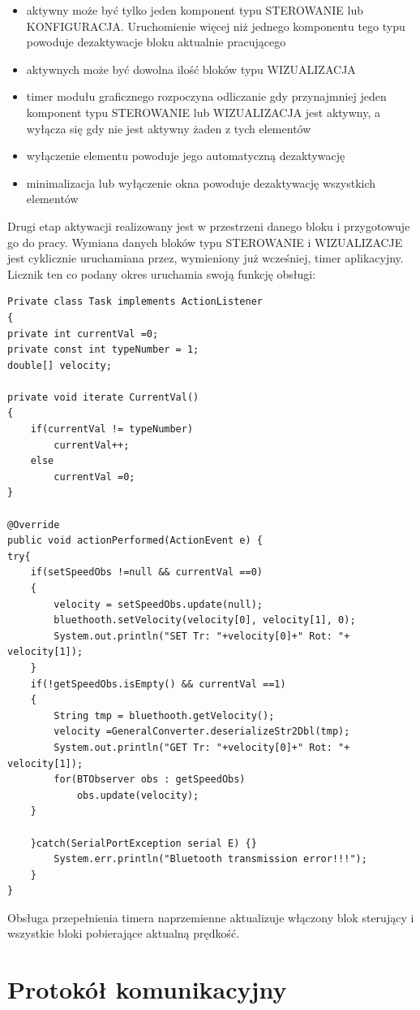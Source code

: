 \documentclass[eng,printmode]{mgr}
\begin{document}
\begin{itemize}
 \item aktywny może być tylko jeden komponent typu STEROWANIE lub KONFIGURACJA. Uruchomienie więcej niż jednego komponentu tego typu powoduje dezaktywacje bloku aktualnie pracującego
 \item aktywnych może być dowolna ilość bloków typu WIZUALIZACJA
 \item timer modułu graficznego rozpoczyna odliczanie gdy przynajmniej jeden komponent typu STEROWANIE lub WIZUALIZACJA jest aktywny, a wyłącza się gdy nie jest aktywny żaden z tych elementów
 \item wyłączenie elementu powoduje jego automatyczną dezaktywację
 \item minimalizacja lub wyłączenie okna powoduje dezaktywację wszystkich elementów
\end{itemize}
\newpage
Drugi etap aktywacji realizowany jest w przestrzeni danego bloku i przygotowuje go do pracy. Wymiana danych  bloków typu STEROWANIE  i WIZUALIZACJE jest  cyklicznie uruchamiana przez, wymieniony już wcześniej,  timer aplikacyjny. Licznik ten co podany okres uruchamia swoją funkcję obsługi:

\begin{lstlisting}[style=java]
Private class Task implements ActionListener
{
private int currentVal =0;
private const int typeNumber = 1; 
double[] velocity;
		
private void iterate CurrentVal()
{
	if(currentVal != typeNumber)
		currentVal++;
	else
		currentVal =0;
}
		
@Override
public void actionPerformed(ActionEvent e) {
try{	
	if(setSpeedObs !=null && currentVal ==0)
	{
		velocity = setSpeedObs.update(null);
		bluethooth.setVelocity(velocity[0], velocity[1], 0);
		System.out.println("SET Tr: "+velocity[0]+" Rot: "+ velocity[1]);
	}
	if(!getSpeedObs.isEmpty() && currentVal ==1)
	{
		String tmp = bluethooth.getVelocity();
		velocity =GeneralConverter.deserializeStr2Dbl(tmp);
		System.out.println("GET Tr: "+velocity[0]+" Rot: "+ velocity[1]);
		for(BTObserver obs : getSpeedObs)
			obs.update(velocity);
	}
				
	}catch(SerialPortException serial E) {}
		System.err.println("Bluetooth transmission error!!!");	
	}
}
\end{lstlisting}
Obsługa przepełnienia timera naprzemienne aktualizuje włączony blok sterujący i  wszystkie bloki pobierające aktualną prędkość.

\chapter{Protokół komunikacyjny}  
\end{document}
